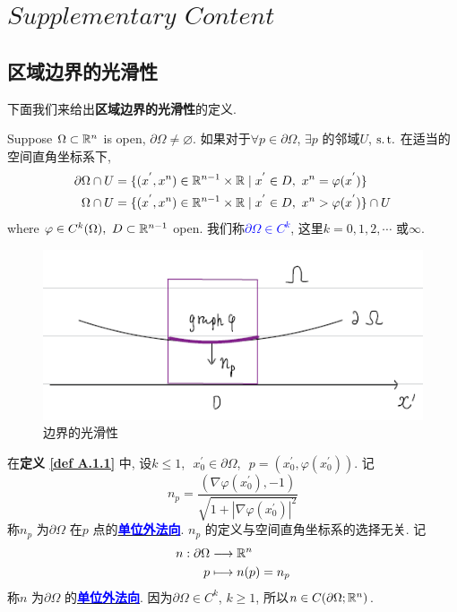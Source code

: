 \ifx\allfiles\undefined


	\else
	\fi
\appendix
\chapter{$Supplementary \,\, Content$}\label{appendix A}

\section{区域边界的光滑性}
	下面我们来给出\textbf{区域边界的光滑性}的定义.
	
	\begin{defn}\label{def A.1.1}
		Suppose $\Omega \subset \mathbb{R}^n$ is open, $\partial \Omega \neq \varnothing$. 如果对于$\forall p \in \partial \Omega$, $\exists p$ 的邻域$U$, $\operatorname{s.t.}$ 在适当的空间直角坐标系下, 
		\begin{align}
			\partial \Omega \cap U &= \{ (x^{'} , x^{n}) \in \mathbb{R}^{n - 1} \times \mathbb{R} \mid x^{'} \in D , \,\, x^n = \varphi(x^{'}) \} \\
			\Omega \cap U &= \{ (x^{'} , x^n) \in \mathbb{R}^{n - 1} \times \mathbb{R} \mid x^{'} \in D , \,\, x^n > \varphi(x^{'}) \} \cap U
		\end{align}
		where $\varphi \in C^{k}(\Omega) , \,\, D \subset \mathbb{R}^{n - 1}$ open. 我们称\underline{\textcolor{blue}{\textbf{$\partial \Omega \in C^k$}}}, 这里$k = 0 , 1 , 2 , \cdots$ 或$\infty$.
		
		\begin{figure}[thbp!]
			\centering
			\includegraphics[width=0.5\linewidth]{figure/A.1-1}
			\caption{边界的光滑性}
			\label{pic : A.1-1} %
		\end{figure}
		
		\begin{rmk}
			在\textbf{定义 \ref{def A.1.1}} 中, 设$k \leq 1$, $\,\, x_{0}^{'} \in \partial \Omega$, $\,\, p = (x_{0}^{'} , \varphi(x_{0}^{'}))$. 记
			\[ n_p = \frac{(\nabla \varphi(x_{0}^{'}) , -1)}{\sqrt{1 + \left| \nabla \varphi(x_{0}^{'}) \right|^2}} \]
			称$n_p$ 为$\partial \Omega$ 在$p$ 点的\underline{\textcolor{blue}{\textbf{单位外法向}}}. $n_p$ 的定义与空间直角坐标系的选择无关. 记
			\begin{align}
				n : \partial \Omega &\longrightarrow \mathbb{R}^n \\
				p &\longmapsto n(p) = n_p 
			\end{align}
			称$n$ 为$\partial \Omega$ 的\underline{\textcolor{blue}{\textbf{单位外法向}}}. 因为$\partial \Omega \in C^k$, $k \geq 1$, 所以$n \in C(\partial \Omega ; \mathbb{R}^n)$.
		\end{rmk}
	\end{defn}

